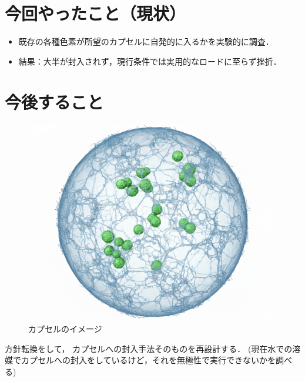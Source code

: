 \documentclass[dvipdfmx]{jsarticle}
\begin{document}
\section{今回やったこと（現状）}
\begin{itemize}
  \item 既存の各種色素が所望のカプセルに自発的に入るかを実験的に調査．
  \item 結果：大半が封入されず，現行条件では実用的なロードに至らず挫折．
\end{itemize}

\section{今後すること}

\begin{figure}
\centering
\includegraphics[scale= 0.10]{dotgraph.png} 
\caption{カプセルのイメージ}
\end{figure}

方針転換をして，
カプセルへの封入手法そのものを再設計する．
(現在水での溶媒でカプセルへの封入をしているけど，それを無極性で実行できないかを調べる)
\end{document}
